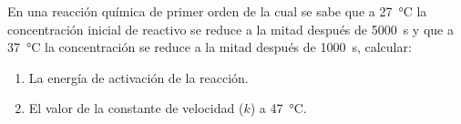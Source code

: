 En una reacción química de primer orden de la cual se sabe que a \SI{27}{\celsius} la concentración inicial de reactivo se reduce a la mitad después de \SI{5000}{\second} y que a \SI{37}{\celsius} la concentración se reduce a la mitad después de \SI{1000}{\second}, calcular:
\begin{enumerate}[label={\alph*)},font={\color{red!50!black}\bfseries}]
	\item La energía de activación de la reacción.
	\item El valor de la constante de velocidad ($k$) a \SI{47}{\celsius}.
\end{enumerate}
